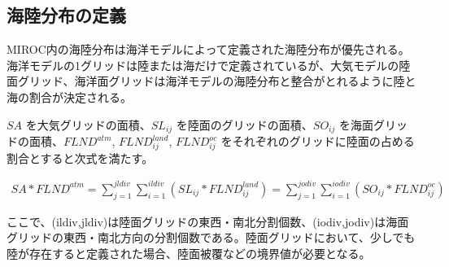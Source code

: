 \hypertarget{ux6d77ux9678ux5206ux5e03ux306eux5b9aux7fa9}{%
\subsection{海陸分布の定義}\label{ux6d77ux9678ux5206ux5e03ux306eux5b9aux7fa9}}

MIROC内の海陸分布は海洋モデルによって定義された海陸分布が優先される。
海洋モデルの1グリッドは陸または海だけで定義されているが、大気モデルの陸面グリッド、海洋面グリッドは海洋モデルの海陸分布と整合がとれるように陸と海の割合が決定される。

\(SA\) を大気グリッドの面積、\(SL _ {ij}\)
を陸面のグリッドの面積、\(SO _ {ij}\)
を海面グリッドの面積、\(FLND^{atm}\), \(FLND^{land} _ {ij}\),
\(FLND^{oc} _ {ij}\)
をそれぞれのグリッドに陸面の占める割合とすると次式を満たす。

\begin{eqnarray} SA*FLND^{atm} = \sum _ {j=1}^{jldiv}\sum _ {i=1}^{ildiv}(SL _ {ij}*FLND^{land} _ {ij}) = \sum _ {j=1}^{jodiv}\sum _ {i=1}^{iodiv}(SO _ {ij}*FLND^{oc } _{ij}) \end{eqnarray}

ここで、(ildiv,jldiv)は陸面グリッドの東西・南北分割個数、(iodiv,jodiv)は海面グリッドの東西・南北方向の分割個数である。陸面グリッドにおいて、少しでも陸が存在すると定義された場合、陸面被覆などの境界値が必要となる。
